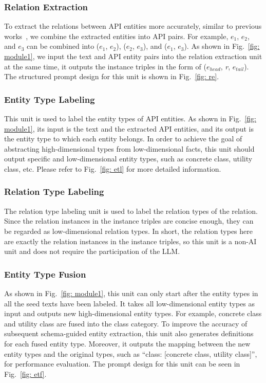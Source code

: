 \subsubsection{Relation Extraction}\label{sec: relation extraction}
To extract the relations between API entities more accurately, similar to previous works~\cite{yanbang2}, we combine the extracted entities into API pairs. 
For example, \textit{$e_{1}$}, \textit{$e_{2}$}, and \textit{$e_{3}$} can be combined into (\textit{$e_{1}$}, \textit{$e_{2}$}), (\textit{$e_{2}$}, \textit{$e_{3}$}), and (\textit{$e_{1}$}, \textit{$e_{3}$}).
As shown in Fig.~\ref{fig: module1}, we input the text and API entity pairs into the relation extraction unit at the same time, it outputs the instance triples in the form of (\textit{$e_{head}$}, \textit{r}, \textit{$e_{tail}$}).
The structured prompt design for this unit is shown in Fig.~\ref{fig: re}.

\subsubsection{Entity Type Labeling}
This unit is used to label the entity types of API entities. 
As shown in Fig.~\ref{fig: module1}, its input is the text and the extracted API entities, and its output is the entity type to which each entity belongs.
In order to achieve the goal of abstracting high-dimensional types from low-dimensional facts, this unit should output specific and low-dimensional entity types, such as concrete class, utility class, etc.
Please refer to Fig.~\ref{fig: etl} for more detailed information.

\subsubsection{Relation Type Labeling}\label{sec: Relation Type Labeling}
The relation type labeling unit is used to label the relation types of the relation. 
Since the relation instances in the instance triples are concise enough, they can be regarded as low-dimensional relation types.
In short, the relation types here are exactly the relation instances in the instance triples, so this unit is a non-AI unit and does not require the participation of the LLM.

\subsubsection{Entity Type Fusion}
As shown in Fig.~\ref{fig: module1}, this unit can only start after the entity types in all the seed texts have been labeled.
It takes all low-dimensional entity types as input and outputs new high-dimensional entity types.
For example, concrete class and utility class are fused into the class category.
To improve the accuracy of subsequent schema-guided entity extraction, this unit also generates definitions for each fused entity type.
Moreover, it outputs the mapping between the new entity types and the original types, such as ``class: [concrete class, utility class]'', for performance evaluation.
The prompt design for this unit can be seen in Fig.~\ref{fig: etf}.

